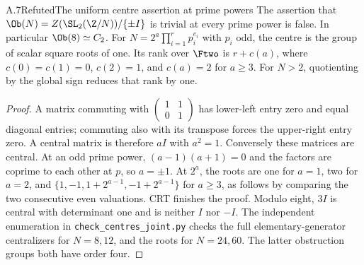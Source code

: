 \begin{statement}{A.7}{Refuted}{The uniform centre assertion at prime powers}
The assertion that
$\Ob(N)=Z(\SL_2(\Z/N))/\{\pm I\}$ is trivial at every prime
power is false. In particular $\Ob(8)\simeq C_2$.
For $N=2^a\prod_{i=1}^r p_i^{e_i}$ with $p_i$ odd,
the centre is the group of scalar square roots of one. Its rank
over $\Ftwo$ is $r+c(a)$, where
$c(0)=c(1)=0$, $c(2)=1$, and $c(a)=2$ for $a\ge3$.
For $N>2$, quotienting by the global sign reduces that rank by one.
\end{statement}
\begin{proof}
A matrix commuting with
$\left(\begin{smallmatrix}1&1\\0&1\end{smallmatrix}\right)$
has lower-left entry zero and equal diagonal entries; commuting
also with its transpose forces the upper-right entry zero. A
central matrix is therefore $aI$ with $a^2=1$. Conversely these
matrices are central. At an odd prime power,
$(a-1)(a+1)=0$ and the factors are coprime to each other at $p$,
so $a=\pm1$. At $2^a$, the roots are one for $a=1$, two for
$a=2$, and $\{1,-1,1+2^{a-1},-1+2^{a-1}\}$ for $a\ge3$,
as follows by comparing the two consecutive even valuations.
CRT finishes the proof. Modulo eight, $3I$ is central with
determinant one and is neither $I$ nor $-I$. The independent
enumeration in \texttt{check\_centres\_joint.py} checks the full
elementary-generator centralizers for $N=8,12$, and the roots for
$N=24,60$. The latter obstruction groups both have order four.
\end{proof}

